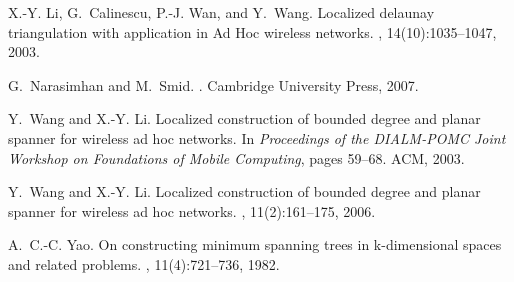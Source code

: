 \documentclass{stacs_proc}
\theoremstyle{plain}\newtheorem{satz}[thm]{Satz}
\begin{document}
\begin{thebibliography}{10}
X.-Y. Li, G.~Calinescu, P.-J. Wan, and Y.~Wang.
\newblock Localized delaunay triangulation with application in {Ad Hoc}
  wireless networks.
,
  14(10):1035--1047, 2003.

G.~Narasimhan and M.~Smid.
.
\newblock Cambridge University Press, 2007.

Y.~Wang and X.-Y. Li.
\newblock Localized construction of bounded degree and planar spanner for
  wireless ad hoc networks.
\newblock In {\em Proceedings of the {DIALM-POMC} Joint Workshop on Foundations
  of Mobile Computing}, pages 59--68. ACM, 2003.

Y.~Wang and X.-Y. Li.
\newblock Localized construction of bounded degree and planar spanner for
  wireless ad hoc networks.
, 11(2):161--175, 2006.

A.~C.-C. Yao.
\newblock On constructing minimum spanning trees in k-dimensional spaces and
  related problems.
, 11(4):721--736, 1982.

\end{thebibliography}
\end{document}
